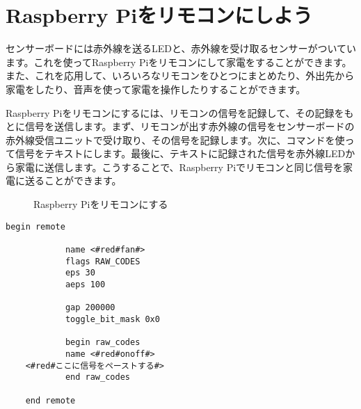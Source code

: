 \newpage
\section{Raspberry Piをリモコンにしよう}
センサーボードには赤外線を送るLEDと、赤外線を受け取るセンサーがついています。これを使ってRaspberry Piをリモコンにして家電をすることができます。また、これを応用して、いろいろなリモコンをひとつにまとめたり、外出先から家電をしたり、音声を使って家電を操作したりすることができます。

Raspberry Piをリモコンにするには、リモコンの信号を記録して、その記録をもとに信号を送信します。まず、リモコンが出す赤外線の信号をセンサーボードの赤外線受信ユニットで受け取り、その信号を記録します。次に、コマンドを使って信号をテキストにします。最後に、テキストに記録された信号を赤外線LEDから家電に送信します。こうすることで、Raspberry Piでリモコンと同じ信号を家電に送ることができます。
\begin{figure}[H]
    \centering
 
    \caption{Raspberry Piをリモコンにする}
\end{figure}
\begin{lstlisting}[caption=template.lircd.conf,label=template.lircd.conf]
    begin remote
    
            name <#red#fan#>
            flags RAW_CODES
            eps 30
            aeps 100
    
            gap 200000
            toggle_bit_mask 0x0
    
            begin raw_codes
            name <#red#onoff#>
    <#red#ここに信号をペーストする#>
            end raw_codes
    
    end remote
    \end{lstlisting}

\newpage
